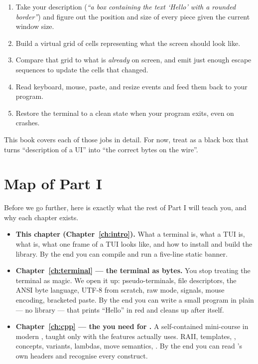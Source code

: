 \begin{enumerate}[leftmargin=*]
  \item Take your description (\emph{``a box containing the text
    `Hello' with a rounded border''}) and figure out the position
    and size of every piece given the current window size.
  \item Build a virtual grid of cells representing what the screen
    should look like.
  \item Compare that grid to what is \emph{already} on screen, and
    emit just enough escape sequences to update the cells that
    changed.
  \item Read keyboard, mouse, paste, and resize events and feed them
    back to your program.
  \item Restore the terminal to a clean state when your program
    exits, even on crashes.
\end{enumerate}

This book covers each of those jobs in detail. For now, treat
\maya{} as a black box that turns ``description of a UI'' into ``the
correct bytes on the wire''.

\section{Map of Part I}
\label{sec:intro:map}

Before we go further, here is exactly what the rest of Part I will
teach you, and why each chapter exists.

\begin{itemize}[leftmargin=*]
  \item \textbf{This chapter (Chapter~\ref{ch:intro}).} What a
    terminal is, what a TUI is, what \maya{} is, what one frame of
    a TUI looks like, and how to install and build the library.
    By the end you can compile and run a five-line static banner.
  \item \textbf{Chapter~\ref{ch:terminal} --- the terminal as
    bytes.} You stop treating the terminal as magic. We open it
    up: pseudo-terminals, file descriptors, the ANSI byte language,
    UTF-8 from scratch, raw mode, signals, mouse encoding,
    bracketed paste. By the end you can write a small program in
    plain \cpp{} --- no library --- that prints ``Hello'' in red and
    cleans up after itself.
  \item \textbf{Chapter~\ref{ch:cpp} --- the \cpp{} you need for
    \maya{}.} A self-contained mini-course in modern \cpp{}, taught
    only with the features \maya{} actually uses. RAII, templates,
    , concepts, variants, lambdas, move semantics,
    . By the end you can read \maya{}'s own headers
    and recognise every construct.
\end{itemize}

